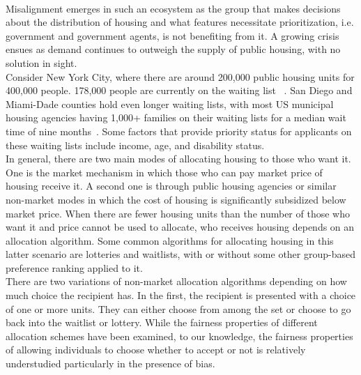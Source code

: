 \documentclass[11pt]{article}
\begin{document}
\\ Misalignment emerges in such an ecosystem as the group that makes decisions about the distribution of housing and what features necessitate prioritization, i.e. government and government agents, is not benefiting from it. A growing crisis ensues as demand continues to outweigh the supply of public housing, with no solution in sight. \\
\newline
Consider New York City, where there are around 200,000 public housing units for 400,000 people. 178,000 people are currently on the waiting list ~\cite{sonya_acosta_long_2021}. San Diego and Miami-Dade counties hold even longer waiting lists, with most US municipal housing agencies having 1,000+ families on their waiting lists for a median wait time of nine months~\cite{nlihc_out_2019}. Some factors that provide priority status for applicants on these waiting lists include income, age, and disability status. \\
\newline
In general, there are two main modes of allocating housing to those who want it. One is the market mechanism in which those who can pay market price of housing receive it. A second one is through public housing agencies or similar non-market modes in which the cost of housing is significantly subsidized below market price. When there are fewer housing units than the number of those who want it and price cannot be used to allocate, who receives housing depends on an allocation algorithm. Some common algorithms for allocating housing in this latter scenario are lotteries and waitlists, with or without some other group-based preference ranking applied to it.\\
 \newline
There are two variations of non-market allocation algorithms depending on how much choice the recipient has. In the first, the recipient is presented with a choice of one or more units. They can either choose from among the set or choose to go back into the waitlist or lottery. While the fairness properties of different allocation schemes have been examined, to our knowledge, the fairness properties of allowing individuals to choose whether to accept or not is relatively understudied particularly in the presence of bias.\\
\end{document}
